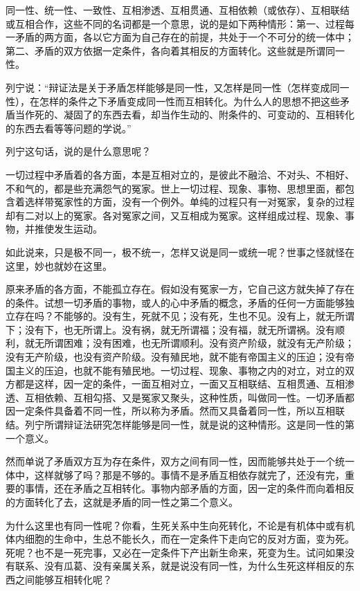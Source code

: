 同一性、统一性、一致性、互相渗透、互相贯通、互相依赖（或依存）、互相联结或互相合作，这些不同的名词都是一个意思，说的是如下两种情形：第一、过程每一矛盾的两方面，各以它方面为自己存在的前提，共处于一个不可分的统一体中；第二、矛盾的双方依据一定条件，各向着其相反的方面转化。这些就是所谓同一性。

列宁说：“辩证法是关于矛盾怎样能够是同一性，又怎样是同一性（怎样变成同一性），在怎样的条件之下矛盾变成同一性而互相转化。为什么人的思想不把这些矛盾当作死的、凝固了的东西去看，却当作生动的、附条件的、可变动的、互相转化的东西去看等等问题的学说。”

列宁这句话，说的是什么意思呢？

一切过程中矛盾着的各方面，本是互相对立的，是彼此不融洽、不对头、不相好、不和气的，都是些充满怨气的冤家。世上一切过程、现象、事物、思想里面，都包含着选样带冤家性的方面，没有一个例外。单纯的过程只有一对冤家，复杂的过程却有二对以上的冤家。各对冤家之间，又互相成为冤家。这样组成过程、现象、事物，并推使发生运动。

如此说来，只是极不同一，极不统一，怎样又说是同一或统一呢？世事之怪就怪在这里，妙也就妙在这里。

原来矛盾的各方面，不能孤立存在。假如没有冤家一方，它自己这方就失掉了存在的条件。试想一切矛盾的事物，或人的心中矛盾的概念，矛盾的任何一方面能够独立存在吗？不能够的。没有生，死就不见；没有死，生也不见。没有上，就无所谓下；没有下，也无所谓上。没有祸，就无所谓福；没有福，就无所谓祸。没有顺利，就无所谓困难；没有困难，也无所谓顺利。没有资产阶级，就没有无产阶级；没有无产阶级，也没有资产阶级。没有殖民地，就不能有帝国主义的压迫；没有帝国主义的压迫，也就不能有殖民地。一切过程、现象、事物之内的对立，对立的双方都是这样，因一定的条件，一面互相对立，一面又互相联结、互相贯通、互相渗透、互相依赖、互相勾搭、又是冤家又聚头，这种性质，叫做同一性。一切矛盾都因一定条件具备着不同一性，所以称为矛盾。然而又具备着同一性，所以互相联结。列宁所谓辩证法研究怎样能够是同一性，就是说的这种情形。这是同一性的第一个意义。

然而单说了矛盾双方互为存在条件，双方之间有同一性，因而能够共处于一个统一体中，这样就够了吗？那是不够的。事情不是矛盾互相依存就完了，还没有完，重要的事情，还在矛盾之互相转化。事物内部矛盾的方面，因一定的条件而向着相反的方面转化了去，这就是矛盾的同一性之第二个意义。

为什么这里也有同一性呢？你看，生死关系中生向死转化，不论是有机体中或有机体内细胞的生命中，生总不能长久，而在一定条件下走向它的反对方面，变为死。死呢？也不是一死完事，又必在一定条件下产出新生命来，死变为生。试问如果没有联系、没有瓜葛、没有亲属关系，就是说没有同一性，为什么生死这样相反的东西之间能够互相转化呢？

